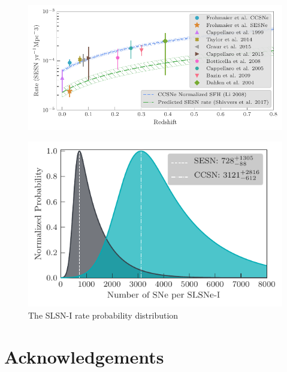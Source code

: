 \documentclass[a4paper,fleqn,usenatbib]{mnras}
\begin{document}
\begin{figure}
	\includegraphics[width=\linewidth]{./allCC_Compare_Literature.pdf}
    \caption{}
    \label{fig:rates_CC_lit}
\end{figure}

\begin{figure}
	\includegraphics[width=\linewidth]{./bothRateCompare.pdf}
    \caption{The SLSN-I rate probability distribution}
    \label{fig:compare2SLSN}
\end{figure}

\section*{Acknowledgements}





% 
\end{document}
